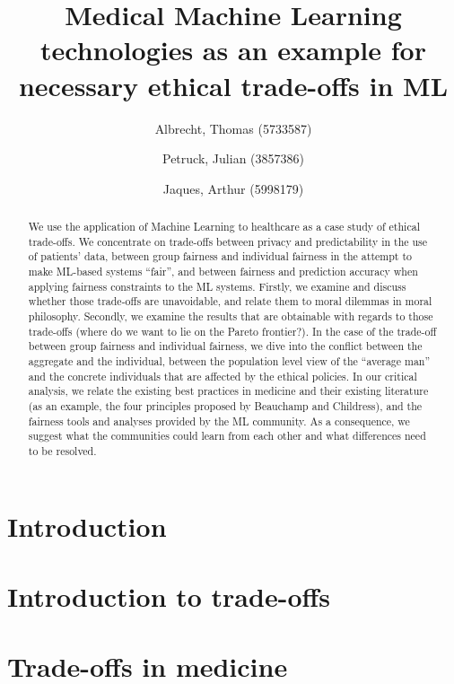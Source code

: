 \documentclass[11pt,english]{article}
\title{Medical Machine Learning technologies as an example for necessary ethical trade-offs in ML}
\author{
    Albrecht, Thomas (5733587)
    \and
    Petruck, Julian (3857386)
    \and
    Jaques, Arthur (5998179)}
\newcommand{\idea}[1]{\color{blue}{#1}\color{black}}
\begin{document}

\maketitle

\begin{abstract}
	\idea{To change!}
	We use the application of Machine Learning to healthcare as a case study of ethical trade-offs.
	We concentrate on trade-offs between privacy and predictability in the use of patients' data, between group fairness and individual fairness in the attempt to make ML-based systems ``fair'', and between fairness and prediction accuracy when applying fairness constraints to the ML systems.
	Firstly, we examine and discuss whether those trade-offs are unavoidable, and relate them to moral dilemmas in moral philosophy.
	Secondly, we examine the results that are obtainable with regards to those trade-offs (where do we want to lie on the Pareto frontier?).
	In the case of the trade-off between group fairness and individual fairness, we dive into the conflict between the aggregate and the individual, between the population level view of the ``average man'' and the concrete individuals that are affected by the ethical policies.
	In our critical analysis, we relate the existing best practices in medicine and their existing literature (as an example, the four principles proposed by Beauchamp and Childress), and the fairness tools and analyses provided by the ML community.
	As a consequence, we suggest what the communities could learn from each other and what differences need to be resolved.
\end{abstract}


\clearpage
\setcounter{tocdepth}{2}
\tableofcontents
\clearpage


\section{Introduction}
\label{introduction}


\section{Introduction to trade-offs}
\label{tradeoff}


\section{Trade-offs in medicine}
\label{medicine}

\end{document}
